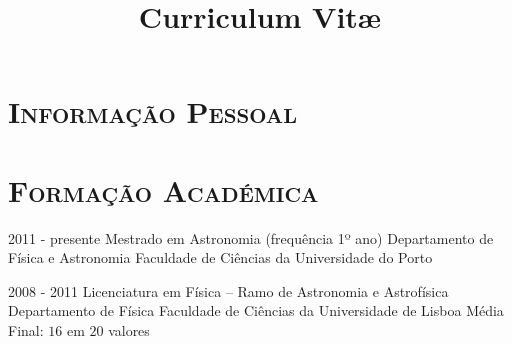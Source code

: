 \documentclass[10pt]{moderncv}
\title{Curriculum Vit\ae{}}
\begin{document}
\maketitle

\section{\textsc{Informação Pessoal}} 




\section{\textsc{Formação Académica}}
\hspace{\fill}

\cventry
	{2011 - presente}
	{Mestrado em Astronomia (frequência 1º ano)}
	{\newline Departamento de Física e Astronomia}
	{Faculdade de Ciências da Universidade do Porto}
	{}
	{\hspace{\fill}}  %

\cventry
	{2008 - 2011}
	{Licenciatura em Física – Ramo de Astronomia e Astrofísica} 
	{\newline Departamento de Física}
	{Faculdade de Ciências da Universidade de Lisboa}
	{\newline Média Final: $16$ em $20$ valores}
	{\hspace{\fill}}


\end{document}
